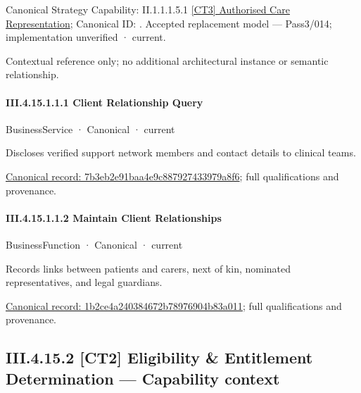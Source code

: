 {\small Canonical Strategy Capability: II.1.1.1.5.1 \hyperref[element:a7092757af934517850ff63707397050]{[CT3] Authorised Care Representation}; Canonical ID: \texttt{}. Accepted replacement model — Pass3/014; implementation unverified · current.}\par
Contextual reference only; no additional architectural instance or semantic relationship.\par
\paragraph*{III.4.15.1.1.1 Client Relationship Query}
\label{navigation:III.4.15.1.1.1}

\label{element:7b3eb2e91baa4e9c887927433979a8f6}
{\small BusinessService · Canonical · current}\par

Discloses verified support network members and contact details to clinical teams.


{\footnotesize \href{../../../../../../../../continuum/business/business-service/7b3eb2e91baa4e9c887927433979a8f6.md}{Canonical record: 7b3eb2e91baa4e9c887927433979a8f6}; full qualifications and provenance.}\par
\paragraph*{III.4.15.1.1.2 Maintain Client Relationships}
\label{navigation:III.4.15.1.1.2}

\label{element:1b2ce4a240384672b78976904b83a011}
{\small BusinessFunction · Canonical · current}\par

Records links between patients and carers, next of kin, nominated representatives, and legal guardians.


{\footnotesize \href{../../../../../../../../continuum/business/business-function/1b2ce4a240384672b78976904b83a011.md}{Canonical record: 1b2ce4a240384672b78976904b83a011}; full qualifications and provenance.}\par
\subsection*{III.4.15.2 [CT2] Eligibility \& Entitlement Determination — Capability context}
\label{navigation:III.4.15.2}

